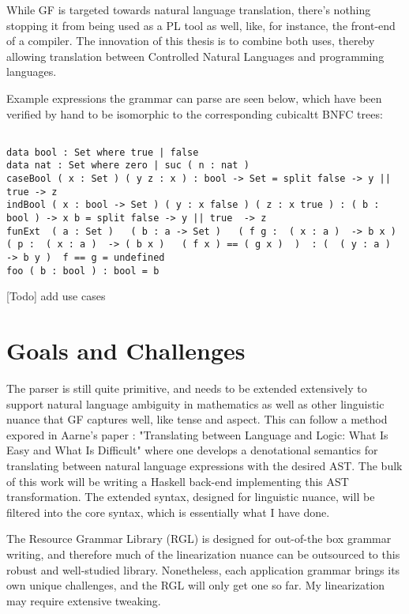 \documentclass[11pt, a4paper]{article}
\begin{document}
While GF is targeted towards natural language translation, there's nothing
stopping it from being used as a PL tool as well, like, for instance, the
front-end of a compiler. The innovation of this thesis is to combine both uses,
thereby allowing translation between Controlled Natural Languages and
programming languages.

Example expressions the grammar can parse are seen below, which have been
verified by hand to be isomorphic to the corresponding cubicaltt BNFC trees:

\begin{verbatim}

data bool : Set where true | false 
data nat : Set where zero | suc ( n : nat )  
caseBool ( x : Set ) ( y z : x ) : bool -> Set = split false -> y || true -> z
indBool ( x : bool -> Set ) ( y : x false ) ( z : x true ) : ( b : bool ) -> x b = split false -> y || true  -> z
funExt  ( a : Set )   ( b : a -> Set )   ( f g :  ( x : a )  -> b x )   ( p :  ( x : a )  -> ( b x )   ( f x ) == ( g x )  )  : (  ( y : a )  -> b y )  f == g = undefined
foo ( b : bool ) : bool = b

\end{verbatim}

[Todo] add use cases

\section{Goals and Challenges}

The parser is still quite primitive, and needs to be extended extensively to
support natural language ambiguity in mathematics as well as other linguistic
nuance that GF captures well, like tense and aspect. This can follow a method
expored in Aarne's paper : "Translating between Language and Logic: What Is
Easy and What Is Difficult" where one develops a denotational semantics for
translating between natural language expressions with the desired AST. The bulk
of this work will be writing a Haskell back-end implementing this AST
transformation. The extended syntax, designed for linguistic nuance, will be
filtered into the core syntax, which is essentially what I have done.

The Resource Grammar Library (RGL) is designed for out-of-the box grammar
writing, and therefore much of the linearization nuance can be outsourced to
this robust and well-studied library. Nonetheless, each application grammar
brings its own unique challenges, and the RGL will only get one so far. My
linearization may require extensive tweaking.
\end{document}
